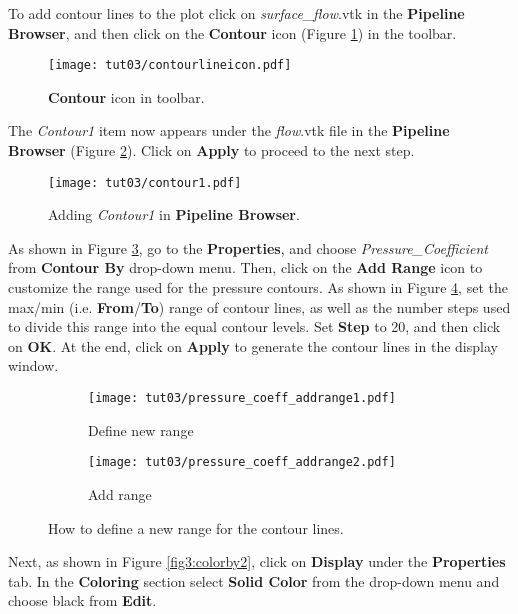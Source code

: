 To add contour lines to the plot click on \textit{surface\_flow}.vtk in the \textbf{Pipeline Browser}, and then click on the \textbf{Contour} icon (Figure \ref{fig3:contour_icon}) in the toolbar.
\begin{figure}[htbp]
    \centering
    \texttt{[image: tut03/contourlineicon.pdf]}
    \caption{\textbf{Contour} icon in toolbar.}
    \label{fig3:contour_icon}
\end{figure}
The \textit{Contour1} item now appears under the \textit{flow}.vtk file in the \textbf{Pipeline Browser} (Figure \ref{fig3:contour1}). Click on \textbf{Apply} to proceed to the next step.
\begin{figure}[htbp]
    \centering
    \texttt{[image: tut03/contour1.pdf]}
    \caption{Adding \textit{Contour1} in \textbf{Pipeline Browser}.}
    \label{fig3:contour1}
\end{figure}
As shown in Figure \ref{fig3:contourby a}, go to the \textbf{Properties}, and choose \textit{Pressure\_Coefficient} from \textbf{Contour By} drop-down menu. Then, click on the \textbf{Add Range} icon to customize the range used for the pressure contours. As shown in Figure \ref{fig3:contourby b}, set the max/min (i.e. \textbf{From}/\textbf{To}) range of contour lines, as well as the number steps used to divide this range into the equal contour levels. Set \textbf{Step} to 20, and then click on \textbf{OK}. At the end, click on \textbf{Apply} to generate the contour lines in the display window.
\begin{figure}[htbp]
    \centering
     \begin{subfigure}[b]{.4\textwidth}
         \centering
         \texttt{[image: tut03/pressure\_coeff\_addrange1.pdf]}
         \caption{Define new range}
         \label{fig3:contourby a}
     \end{subfigure}
     \hfill
     \begin{subfigure}[b]{.4\textwidth}
         \centering
         \texttt{[image: tut03/pressure\_coeff\_addrange2.pdf]}
         \caption{Add range}
         \label{fig3:contourby b}
     \end{subfigure}     
    \caption{How to define a new range for the contour lines.}
    \label{fig3:contourby}
\end{figure}
Next, as shown in Figure \ref{fig3:colorby2}, click on \textbf{Display} under the \textbf{Properties} tab. In the \textbf{Coloring} section select \textbf{Solid Color} from the drop-down menu and choose black from \textbf{Edit}.
